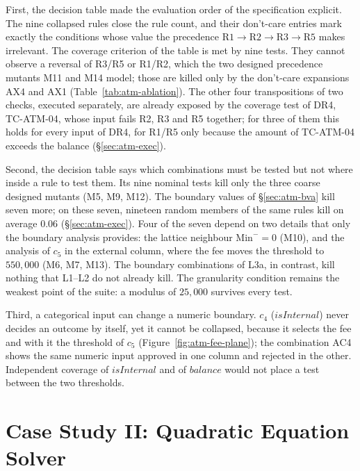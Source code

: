 \documentclass[11pt,a4paper]{article}
\begin{document}
First, the decision table made the evaluation order of the specification
explicit. The nine collapsed rules close the rule count, and their
don't-care entries mark exactly the conditions whose value the precedence
\(\mathrm{R1}\to\mathrm{R2}\to\mathrm{R3}\to\mathrm{R5}\) makes irrelevant.
The coverage criterion of the table is met by nine tests. They cannot
observe a reversal of R3/R5 or R1/R2, which the two designed precedence
mutants M11 and M14 model; those are killed only by the don't-care
expansions AX4 and AX1 (Table~\ref{tab:atm-ablation}). The other four transpositions of two checks, executed separately, are already exposed by the coverage test of DR4, TC-ATM-04, whose input fails R2, R3 and R5 together; for three of them this holds for every input of DR4, for R1/R5 only because the amount of TC-ATM-04 exceeds the balance (\S\ref{sec:atm-exec}).

Second, the decision table says which combinations must be tested but not
where inside a rule to test them. Its nine nominal tests kill only the three
coarse designed mutants (M5, M9, M12). The boundary values of
\S\ref{sec:atm-bva} kill seven more; on these seven, nineteen random members of the
same rules kill on average 0.06 (\S\ref{sec:atm-exec}). Four of the seven
depend on two details that only the boundary analysis provides: the lattice
neighbour \(\mathrm{Min}^-=0\) (M10), and the analysis of \(c_5\) in the
external column, where the fee moves the threshold to \(550{,}000\) (M6,
M7, M13). The boundary combinations of L3a, in contrast, kill nothing that
L1--L2 do not already kill. The granularity condition remains the weakest
point of the suite: a modulus of \(25{,}000\) survives every test.

Third, a categorical input can change a numeric boundary. \(c_4\)
(\(\mathit{isInternal}\)) never decides an outcome by itself, yet it cannot
be collapsed, because it selects the fee and with it the threshold of \(c_5\)
(Figure~\ref{fig:atm-fee-plane}); the combination AC4 shows the same numeric
input approved in one column and rejected in the other. Independent coverage
of \(\mathit{isInternal}\) and of \(\mathit{balance}\) would not place a test
between the two thresholds.
\section{Case Study II: Quadratic Equation Solver}
\label{sec:quad}
\end{document}
